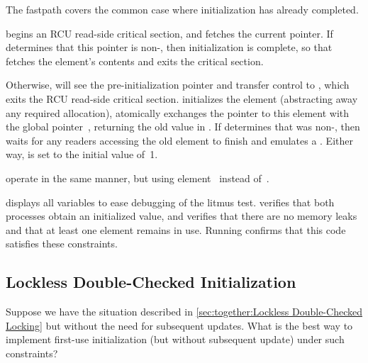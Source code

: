 The fastpath covers the common case where initialization has already
completed.
\begin{fcvref}
 begins an RCU read-side critical section, and  fetches
the current pointer.
If  determines that this pointer is non-, then
initialization is complete, so that  fetches the element's contents
and  exits the critical section.

Otherwise,  will see the pre-initialization  pointer
and transfer control to , which exits the RCU read-side critical
section.
 initializes the element (abstracting away any required allocation),
 atomically exchanges the pointer to this element with the global
pointer~, returning the old value in .
If  determines that  was non-, then 
waits for any readers accessing the old element to finish and 
emulates a .
Either way,  is set to the initial value of~1.
\end{fcvref}

\begin{fcvref}
 operate in the same manner, but using element~ instead
of~.

 displays all variables to ease debugging of the litmus test.
 verifies that both processes obtain an initialized value,
and  verifies that there are no memory leaks and that at least
one element remains in use.
Running  confirms that this code satisfies these constraints.
\end{fcvref}

\QuickQuizEnd

\subsection{Lockless Double-Checked Initialization}
\label{sec:together:Lockless Double-Checked Initialization}

Suppose we have the situation described in
\cref{sec:together:Lockless Double-Checked Locking}
but without the need for subsequent updates.
What is the best way to implement first-use initialization (but without
subsequent update) under such constraints?


